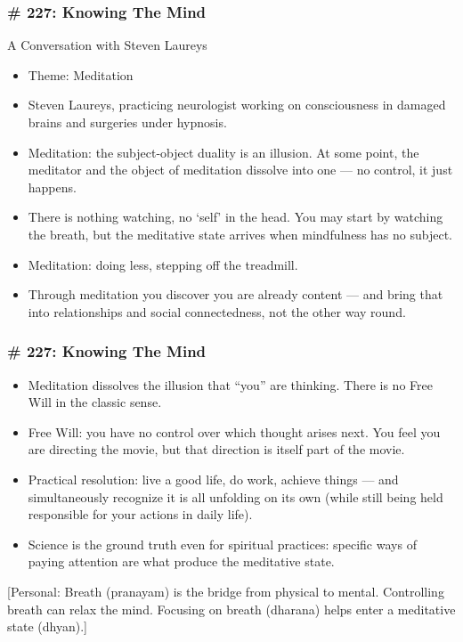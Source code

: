 \begin{frame}[fragile]
\frametitle{\# 227: Knowing The Mind}

A Conversation with Steven Laureys

\begin{itemize}
\item Theme: Meditation
\item Steven Laureys, practicing neurologist working on consciousness in damaged brains and surgeries under hypnosis.
\item Meditation: the subject-object duality is an illusion. At some point, the meditator and the object of meditation dissolve into one --- no control, it just happens.
\item There is nothing watching, no `self' in the head. You may start by watching the breath, but the meditative state arrives when mindfulness has no subject.
\item Meditation: doing less, stepping off the treadmill.
\item Through meditation you discover you are already content --- and bring that into relationships and social connectedness, not the other way round.
\end{itemize}

\end{frame}

\begin{frame}[fragile]
\frametitle{\# 227: Knowing The Mind}

\begin{itemize}
\item Meditation dissolves the illusion that ``you'' are thinking. There is no Free Will in the classic sense.
\item Free Will: you have no control over which thought arises next. You feel you are directing the movie, but that direction is itself part of the movie.
\item Practical resolution: live a good life, do work, achieve things --- and simultaneously recognize it is all unfolding on its own (while still being held responsible for your actions in daily life).
\item Science is the ground truth even for spiritual practices: specific ways of paying attention are what produce the meditative state.
\end{itemize}

[Personal: Breath (pranayam) is the bridge from physical to mental. Controlling breath can relax the mind. Focusing on breath (dharana) helps enter a meditative state (dhyan).]
\end{frame}

